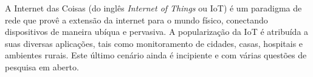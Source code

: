 \documentclass[
    hidelinks,
	12pt,				%
	openany,
	oneside, 
	a4paper,			%
	english,			%
	french,				%
	spanish,			%
	brazil				%
	]{abntex2}
\begin{document}
\begin{resumo}




A Internet das Coisas (do inglês \textit{Internet of Things} ou IoT) é um paradigma de rede que provê a extensão da internet para o mundo físico, conectando dispositivos de maneira ubíqua e pervasiva.  A popularização da IoT é atribuída a suas diversas aplicações, tais como  monitoramento de cidades, casas, hospitais e ambientes rurais. Este último cenário ainda é  incipiente e com várias questões de pesquisa em aberto. 


\end{resumo}
\end{document}
